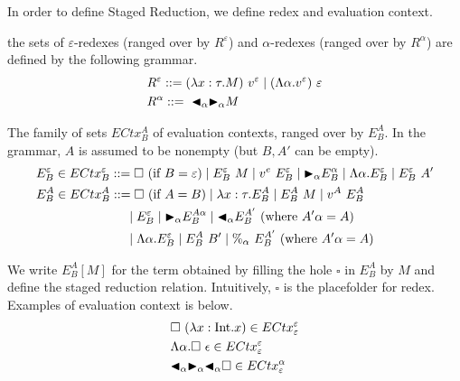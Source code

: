 In order to define Staged Reduction, we define redex and evaluation context.

\begin{definition}[Redex]
    the sets of $\varepsilon$-redexes (ranged over by $R^\varepsilon$) and $\alpha$-redexes (ranged over by $R^\alpha$) are defined by the following grammar.
    \begin{align*}
         & R^\varepsilon ::= (\lambda x:\tau.M)\ v^\varepsilon \mid (\Lambda\alpha.v^\varepsilon)\ \varepsilon \\
         & R^\alpha      ::=\ {\mathop{\blacktriangleleft}}_\alpha {\mathop{\blacktriangleright}}_\alpha M                                                         \\
    \end{align*}
\end{definition}

\begin{definition}
    The family of sets $ECtx^A_B$ of evaluation contexts, ranged over by $E^A_B$.
    In the grammar, $A$ is assumed to be nonempty (but $B,A'$ can be empty).
    \begin{align*}
         & E^\varepsilon_B \in ECtx^\varepsilon_B ::= \square\ (\text{if\ } B = \varepsilon)
        \mid E^\varepsilon_B\ M \mid v^e\ E^\varepsilon_B \mid \TB_\alpha E^\alpha_B
        \mid \Lambda\alpha.E^\varepsilon_B \mid E^\varepsilon_B\ A'                                                                       \\
         & E^A_B \in ECtx^A_B                     ::= \square\ (\text{if } A = B) \mid \lambda x:\tau.E^A_B \mid E^A_B\ M \mid v^A\ E^A_B \\
         & \hspace{25mm} \mid E^\varepsilon_B \mid \TB_\alpha E^{A\alpha}_B \mid \TBL_\alpha E^{A'}_B \ (\text{where } A'\alpha = A)      \\
         & \hspace{25mm} \mid \Lambda\alpha.E^\varepsilon_B \mid E^A_B\ B' \mid \%_\alpha\ E^{A'}_B \ (\text{where } A'\alpha = A)        \\
    \end{align*}
\end{definition}

We write $E^A_B[M]$ for the term obtained by filling the hole $\square$ in $E^A_B$ by $M$
and define the staged reduction relation.
Intuitively, $\square$ is the placefolder for redex.
Examples of evaluation context is below.
\begin{align*}
     & \square\ (\lambda x:\textrm{Int}.x) \in  ECtx^\varepsilon_\varepsilon            \\
     & \Lambda\alpha.\square\ \epsilon \in ECtx^\varepsilon_\varepsilon       \\
     & {\mathop{\blacktriangleleft}}_\alpha {\mathop{\blacktriangleright}}_\alpha {\mathop{\blacktriangleleft}}_\alpha \square \in ECtx^\alpha_\varepsilon
\end{align*}

